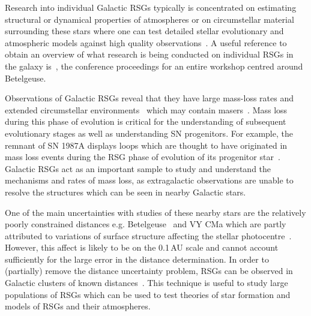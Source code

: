 
Research into individual Galactic RSGs typically is concentrated on estimating structural or dynamical properties of atmospheres or on circumstellar material surrounding these stars where one can test detailed stellar evolutionary and atmospheric models against high quality observations~\citep[e.g.][]{2014A&A...561A..15C}.
A useful reference to obtain an overview of what research is being conducted on individual RSGs in the galaxy is~\cite{2013EAS....60.....K}, the conference proceedings for an entire workshop centred around Betelgeuse.

Observations of Galactic RSGs reveal that they have large mass-loss rates
\citep[10$^{-(6\pm 1)}$\,M$_{\odot}$\,yr$^{-1}$;][]{Danchi94, Richards13,2016AJ....151...51S} and extended circumstellar environments~\citep{Smith01,2014MNRAS.437L...1W} which may contain masers~\citep[e.g.][]{Schuster06,2012ApJ...744...23Z}.
Mass loss during this phase of evolution is critical for the understanding of subsequent evolutionary stages as well as understanding SN progenitors.
For example, the remnant of SN 1987A displays loops which are thought to have originated in mass loss events during the RSG phase of evolution of its progenitor star~\citep[][and references therein]{Humphreys13}.
Galactic RSGs act as an important sample to study and understand the mechanisms and rates of mass loss, as extragalactic observations are unable to resolve the structures which can be seen in nearby Galactic stars.

One of the main uncertainties with studies of these nearby stars are the relatively poorly constrained distances e.g. Betelgeuse~\citep[197\,$\pm$\,45\,pc;][]{Harper08} and VY CMa
\citep[$\sim$1300\,$\pm$\,120\,pc;][]{Wittowski12,2012ApJ...744...23Z} which are partly attributed to variations of surface structure affecting the stellar photocentre~\citep{2011A&A...528A.120C}.
However, this affect is likely to be on the 0.1\,AU scale and cannot account sufficiently for the large error in the distance determination.
In order to (partially) remove the distance uncertainty problem, RSGs can be observed in Galactic clusters of known distances~\citep[e.g.][]{Humphreys78, Mel'Nik95,2014ApJ...788...58G}.
This technique is useful to study large populations of RSGs which can be used to test theories of star formation and models of RSGs and their atmospheres.

